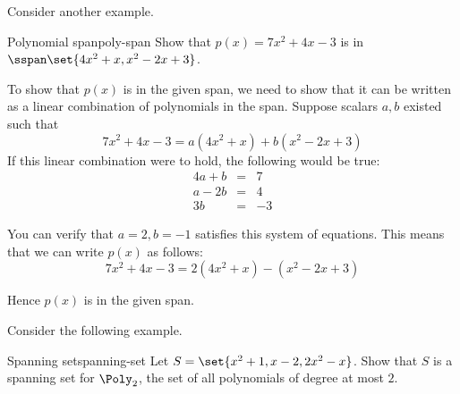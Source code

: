Consider another example.

\begin{example}{Polynomial span}{poly-span}
Show that $p(x) = 7x^2 + 4x - 3$ is in $\sspan\set{4x^2 + x, x^2 -2x + 3 }$.
\end{example}

\begin{solution}
To show that $p(x)$ is in the given span, we need to show that it can be written as a linear combination of polynomials in the span. Suppose scalars $a, b$ existed such that
\[
7x^2 +4x - 3= a(4x^2+x) + b (x^2-2x+3)
\]
If this linear combination were to hold, the following would be true:
\begin{eqnarray*}
4a + b &=& 7 \\
a - 2b &=& 4 \\
3b &=& -3
\end{eqnarray*}

You can verify that $a = 2, b = -1$ satisfies this system of equations. This means that we can write $p(x)$ as follows:
\[
 7x^2 +4x-3= 2(4x^2+x)  - (x^2-2x+3)
\]

Hence $p(x)$ is in the given span.
\end{solution}

Consider the following example.

\begin{example}{Spanning set}{spanning-set}
Let $S = \set{x^2 + 1, x-2, 2x^2 - x }$. Show that $S$ is a spanning set for $\Poly_2$, the set of all polynomials of degree at most $2$.
\end{example}

